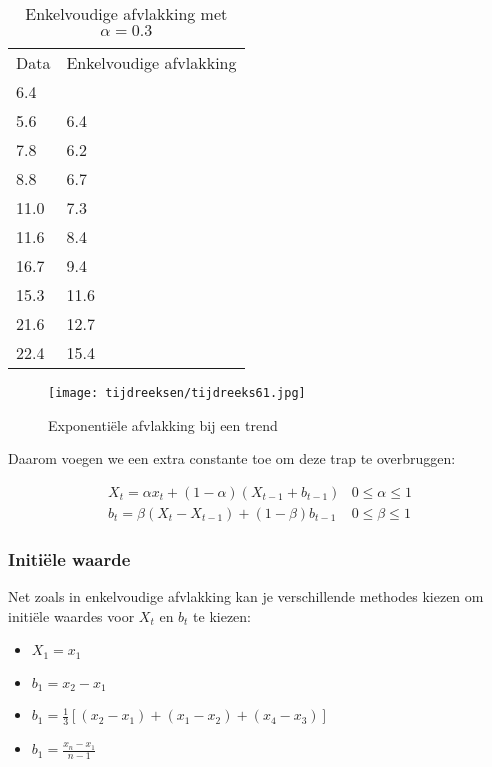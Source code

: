 \begin{table}
\centering
    \begin{tabular}{|ll|}
    \hline
    Data & Enkelvoudige afvlakking \\
    6.4  & ~                      \\
    5.6  & 6.4                    \\
    7.8  & 6.2                    \\
    8.8  & 6.7                    \\
    11.0 & 7.3                    \\
    11.6 & 8.4                    \\
    16.7 & 9.4                    \\
    15.3 & 11.6                   \\
    21.6 & 12.7                   \\
    22.4 & 15.4                   \\ \hline
    \end{tabular}
		\caption{Enkelvoudige afvlakking met $\alpha = 0.3$}
		\label{tab:trend}
\end{table}

\begin{figure}
  \centering
  \texttt{[image: tijdreeksen/tijdreeks61.jpg]}
  \caption{Exponentiële afvlakking bij een trend}
  \label{fig:tijdreeks61}
\end{figure}

Daarom voegen we een extra constante toe om deze trap te overbruggen:

\begin{definition}
\begin{eqnarray}
	X_{t} = \alpha x_{t} + (1-\alpha)(X_{t-1} + b_{t-1}) & 0 \leq \alpha \leq 1 \\
	b_{t} = \beta(X_{t}-X_{t-1}) + (1-\beta)b_{t-1} & 0 \leq \beta \leq 1 
\label{eq:doubleSmoothing}
\end{eqnarray}
\end{definition}

\subsubsection{Initiële waarde}

Net zoals in enkelvoudige afvlakking kan je verschillende methodes kiezen om initiële waardes voor $X_{t}$ en $b_{t}$ te kiezen:

\begin{itemize}
	\item $X_{1} = x_{1}$
	\item $b_{1} = x_{2} - x_{1}$
	\item $b_{1} = \frac{1}{3}\left[ (x_{2} - x_{1}) + (x_{1} - x_{2}) + (x_{4} - x_{3}) \right]$
	\item $b_{1} = \frac{x_{n} - x_{1}}{n-1}$
\end{itemize}

